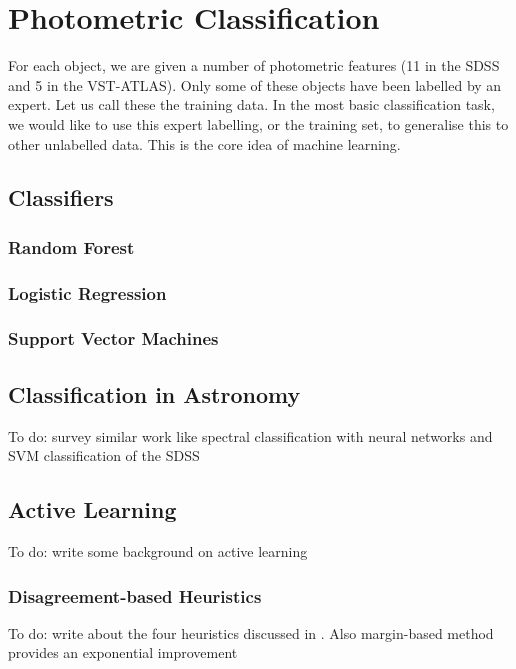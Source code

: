 

\chapter{Photometric Classification}
\label{cha:ml}

For each object, we are given a number of photometric features (11 in the SDSS and 5 in the 
VST-ATLAS). Only some of these objects have been labelled by an expert. Let us call these
the training data. In the most basic
classification task, we would like to use this expert labelling, or the training set, to generalise this to other unlabelled data. This is the core idea of machine learning.

\section{Classifiers}
\label{sec:machine}

\subsection{Random Forest}

\subsection{Logistic Regression}

\subsection{Support Vector Machines}


\section{Classification in Astronomy}
To do: survey similar work like spectral classification with neural networks \cite{hala14} and
SVM classification of the SDSS \cite{elting08}

\section{Active Learning}

To do: write some background on active learning \cite{hanneke14}

\subsection{Disagreement-based Heuristics}
To do: write about the four heuristics discussed in \cite{schein07}. Also margin-based method
provides an exponential improvement \cite{balcan12}


